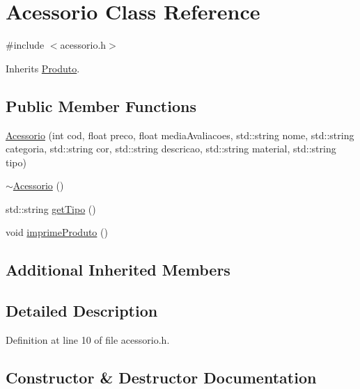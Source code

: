 \hypertarget{class_acessorio}{}\section{Acessorio Class Reference}
\label{class_acessorio}


{\ttfamily \#include $<$acessorio.\+h$>$}



Inherits \hyperlink{class_produto}{Produto}.

\subsection*{Public Member Functions}
\begin{DoxyCompactItemize}
\item 
\hyperlink{class_acessorio_af1afa7c30c469f4ab78ac1bea3ee6334}{Acessorio} (int cod, float preco, float media\+Avaliacoes, std\+::string nome, std\+::string categoria, std\+::string cor, std\+::string descricao, std\+::string material, std\+::string tipo)
\item 
\hyperlink{class_acessorio_a195ee52794ef04607c8a0650eee0534c}{$\sim$\+Acessorio} ()
\item 
std\+::string \hyperlink{class_acessorio_af067ac3ad0d179f1ad86e7809cb86670}{get\+Tipo} ()
\item 
void \hyperlink{class_acessorio_a5c746a8b87acb1505f2e5a7497a08379}{imprime\+Produto} ()
\end{DoxyCompactItemize}
\subsection*{Additional Inherited Members}


\subsection{Detailed Description}


Definition at line 10 of file acessorio.\+h.



\subsection{Constructor \& Destructor Documentation}
\mbox{\label{class_acessorio_af1afa7c30c469f4ab78ac1bea3ee6334}} 
